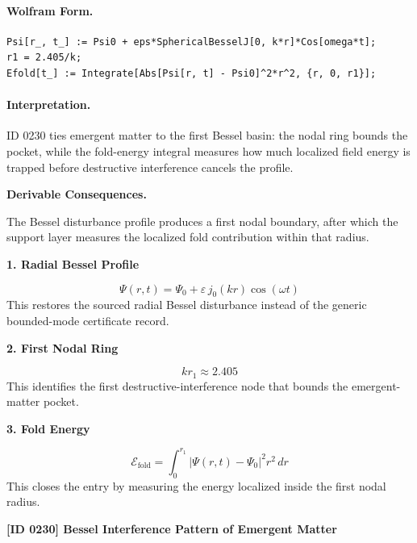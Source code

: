 \paragraph{Wolfram Form.}
\begin{verbatim}
Psi[r_, t_] := Psi0 + eps*SphericalBesselJ[0, k*r]*Cos[omega*t];
r1 = 2.405/k;
Efold[t_] := Integrate[Abs[Psi[r, t] - Psi0]^2*r^2, {r, 0, r1}];
\end{verbatim}

\paragraph{Interpretation.}

ID 0230 ties emergent matter to the first Bessel basin: the nodal ring bounds the pocket, while the fold-energy integral measures how much localized field energy is trapped before destructive interference cancels the profile.

\par\vspace{0.35em}
\noindent\textbf{Derivable Consequences.}\quad
\begingroup
\footnotesize
\raggedright
The Bessel disturbance profile produces a first nodal boundary, after which the support layer measures the localized fold contribution within that radius.
\par\endgroup

\noindent\textbf{1. Radial Bessel Profile}\par
\[
\Psi(r,t)=\Psi_0+\varepsilon\,j_0(k r)\cos(\omega t)
\]
\noindent This restores the sourced radial Bessel disturbance instead of the generic bounded-mode certificate record.\par
\noindent\textbf{2. First Nodal Ring}\par
\[
k r_1 \approx 2.405
\]
\noindent This identifies the first destructive-interference node that bounds the emergent-matter pocket.\par
\noindent\textbf{3. Fold Energy}\par
\[
\mathcal{E}_{\mathrm{fold}}=\int_{0}^{r_1}\lvert\Psi(r,t)-\Psi_0\rvert^2 r^2\,dr
\]
\noindent This closes the entry by measuring the energy localized inside the first nodal radius.\par

\clearpage
\noindent\textbf{[ID 0230] Bessel Interference Pattern of Emergent Matter}\par
\vspace{0.35em}
\begingroup\small

